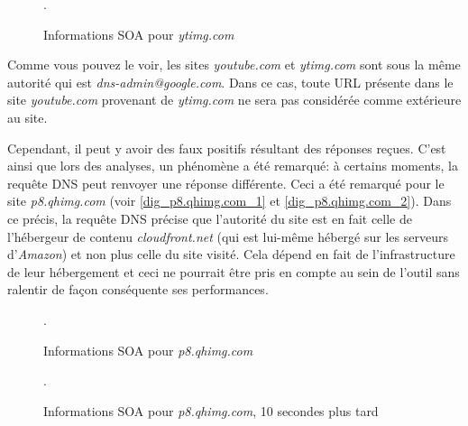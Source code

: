 \begin{figure}[h]
	\centering
	
	\caption{\label{dig_ytimg}Informations SOA pour \textit{ytimg.com}}.
\end{figure}
Comme vous pouvez le voir, les sites \textit{youtube.com} et \textit{ytimg.com} sont sous la même autorité qui est \textit{dns-admin@google.com}. Dans ce cas, toute URL présente dans le site \textit{youtube.com} provenant de \textit{ytimg.com} ne sera pas considérée comme extérieure au site.
\newline

Cependant, il peut y avoir des faux positifs résultant des réponses reçues. C'est ainsi que lors des analyses, un phénomène a été remarqué: à certains moments, la requête DNS peut renvoyer une réponse différente. Ceci a été remarqué pour le site \textit{p8.qhimg.com} (voir \autoref{dig_p8.qhimg.com_1} et \autoref{dig_p8.qhimg.com_2}). Dans ce précis, la requête DNS précise que l'autorité du site est en fait celle de l'hébergeur de contenu \textit{cloudfront.net} (qui est lui-même hébergé sur les serveurs d'\textit{Amazon}) et non plus celle du site visité. Cela dépend en fait de l'infrastructure de leur hébergement et ceci ne pourrait être pris en compte au sein de l'outil sans ralentir de façon conséquente ses performances.

\begin{figure}[h]
	\centering
	
	\caption{\label{dig_p8.qhimg.com_1}Informations SOA pour \textit{p8.qhimg.com}}.
\end{figure}

\begin{figure}[h]
	\centering
	
	\caption{\label{dig_p8.qhimg.com_2}Informations SOA pour \textit{p8.qhimg.com}, 10 secondes plus tard}.
\end{figure}

